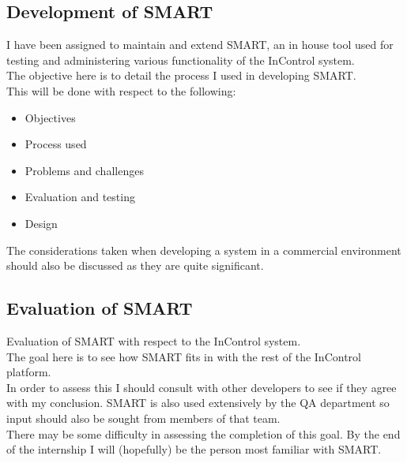 \documentclass[a4paper,12pt, titlepage]{article}
\begin{document}
\subsection{Development of SMART}
I have been assigned to maintain and extend SMART, an in house tool used for testing and administering various functionality of the InControl system.
\\The objective here is to detail the process I used in developing SMART.
\\This will be done with respect to the following:
\begin{itemize}
\item Objectives
\item Process used
\item Problems and challenges
\item Evaluation and testing
\item Design 
\end{itemize}

The considerations taken when developing a system in a commercial environment should also be discussed as they are quite significant.

\subsection{Evaluation of SMART}
Evaluation of SMART with respect to the InControl system.
\\The goal here is to see how SMART fits in with the rest of the InControl platform.
\\In order to assess this I should consult with other developers to see if they agree with my conclusion. SMART is also used extensively by the QA department so input should also be sought from members of that team.
\\There may be some difficulty in assessing the completion of this goal. By the end of the internship I will (hopefully) be the person most familiar with SMART.
\end{document}
